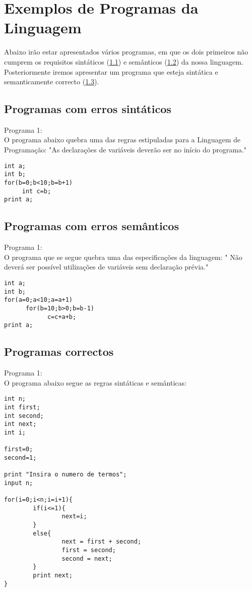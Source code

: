 \documentclass{report}
\begin{document}
\section{Exemplos de Programas da Linguagem}
Abaixo irão estar apresentados vários programas, em que os dois primeiros não cumprem os requisitos sintáticos (\ref{esint}) e semânticos (\ref{esem}) da nossa linguagem. Posteriormente iremos apresentar um programa que esteja sintática e semanticamente correcto (\ref{pc}).
\subsection{Programas com erros sintáticos}\label{esint}
Programa 1:\\
O programa abaixo quebra uma das regras estipuladas para a Linguagem de Programação: "As declarações de variáveis deverão ser no início do programa."
\begin{verbatim}
int a;
int b;
for(b=0;b<10;b=b+1)
     int c=b;
print a;
\end{verbatim}
\subsection{Programas com erros semânticos}\label{esem}
Programa 1:\\
O programa que se segue quebra uma das especificações da linguagem: " Não deverá ser possível utilizações de variáveis sem declaração prévia."

\begin{verbatim}
int a;
int b;
for(a=0;a<10;a=a+1)
      for(b=10;b>0;b=b-1)
            c=c+a+b;
print a;
\end{verbatim}
\subsection{Programas correctos}\label{pc}
Programa 1:\\
O programa abaixo segue as regras sintáticas e semânticas:
\begin{verbatim}
int n;
int first;
int second;
int next;
int i;
 
first=0;
second=1;
 
print "Insira o numero de termos";
input n;
 
for(i=0;i<n;i=i+1){
        if(i<=1){
                next=i;
        }
        else{
                next = first + second;
                first = second;
                second = next;
        }
        print next;
}
\end{verbatim}
\end{document}
